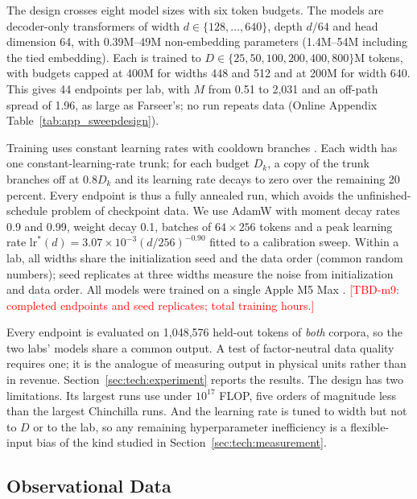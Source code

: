The design crosses eight model sizes with six token budgets. The models are decoder-only transformers of width
$d\in\{128,\dots,640\}$, depth $d/64$ and head dimension 64, with 0.39M--49M non-embedding parameters (1.4M--54M
including the tied embedding). Each is trained to $D\in\{25,50,100,200,400,800\}$M tokens, with budgets capped at
400M for widths 448 and 512 and at 200M for width 640. This gives 44 endpoints per lab, with $M$ from 0.51 to 2,031 and
an off-path spread of 1.96, as large as Farseer's; no run repeats data (Online Appendix
Table~\ref{tab:app_sweepdesign}).

Training uses constant learning rates with cooldown branches \citep{hagele2024scaling}. Each width has one
constant-learning-rate trunk; for each budget $D_k$, a copy of the trunk branches off at $0.8D_k$ and its learning rate
decays to zero over the remaining 20 percent. Every endpoint is thus a fully annealed
run, which avoids the unfinished-schedule problem of checkpoint data. We use AdamW \citep{loshchilov2019decoupled}
with moment decay rates 0.9 and 0.99, weight decay 0.1, batches of $64\times256$ tokens and a peak learning rate
$\mathrm{lr}^{*}(d)=3.07\times10^{-3}(d/256)^{-0.90}$ fitted to a calibration sweep. Within a lab, all widths share
the initialization seed and the data order (common random numbers); seed replicates at three widths measure the noise
from initialization and data order. All models were trained on a single Apple M5 Max \citep{hannun2023mlx}.
\textcolor{red}{[TBD-m9: completed endpoints and seed replicates; total training hours.]}

Every endpoint is evaluated on 1,048,576 held-out tokens of \emph{both} corpora, so the two labs' models share a common
output. A test of factor-neutral data quality requires one; it is the analogue of measuring output in physical units
rather than in revenue. Section~\ref{sec:tech:experiment} reports the results. The design has two limitations. Its
largest runs use under $10^{17}$ FLOP, five orders of magnitude less than the largest Chinchilla runs. And the learning
rate is tuned to width but not to $D$ or to the lab, so any remaining hyperparameter inefficiency is a flexible-input
bias of the kind studied in Section~\ref{sec:tech:measurement}.

\subsection{Observational Data}

